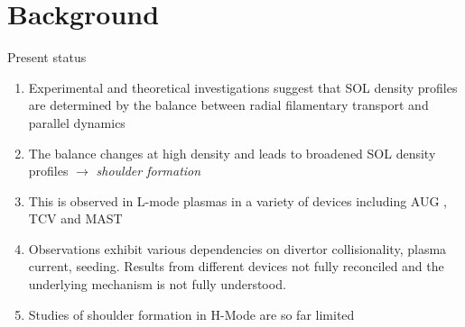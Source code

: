 \documentclass[10pt, compress]{beamer}
\begin{document}
\section{Background}
\begin{frame}{Present status}
  \begin{enumerate}[<+(1) | invisible@-+>]
    \item Experimental and theoretical investigations suggest that SOL density profiles are  determined by the balance between radial filamentary transport and parallel dynamics
    \item The balance changes at high density and leads to broadened SOL density profiles $\rightarrow$ \emph{shoulder formation}
    \item This is observed in L-mode plasmas in a variety of devices including AUG \parencite{Carralero:2014gs},
      TCV \parencite{Garcia:2007p2615} and MAST \parencite{Militello:2016hk}
    \item Observations exhibit various dependencies on divertor
      collisionality, plasma current,  seeding. \alert{Results from
        different devices not fully reconciled and the underlying mechanism is not fully understood.}
    \item Studies of shoulder formation in H-Mode are so far limited 
    \end{enumerate}
\end{frame}
\end{document}
